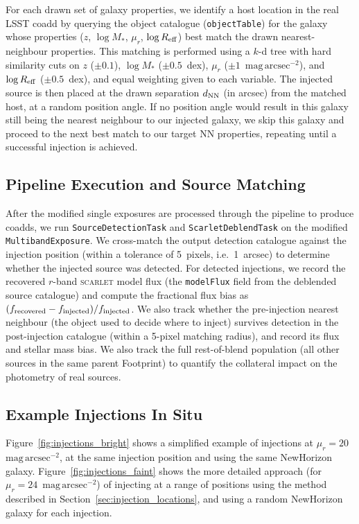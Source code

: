 \documentclass[DM,lsstdraft,authoryear,toc]{lsstdoc}
\newcommand{\mur}{\ensuremath{\mu_r}\xspace}
\newcommand{\Reff}{\ensuremath{R_{\rm eff}}\xspace}
\newcommand{\scarlet}{\textsc{scarlet}\xspace}
\newcommand{\task}[1]{\texttt{#1}\xspace}
\begin{document}
For each drawn set of galaxy properties, we identify a host location in the
real LSST coadd by querying the object catalogue (\texttt{objectTable}) for
the galaxy whose properties ($z$, $\log M_*$, $\mur$, $\log \Reff$) best
match the drawn nearest-neighbour properties. This matching is performed using
a $k$-d tree with hard similarity cuts on $z$ ($\pm 0.1$), $\log M_*$
($\pm 0.5$~dex), $\mur$ ($\pm 1$~$\mathrm{mag\,arcsec^{-2}}$), and
$\log \Reff$ ($\pm 0.5$~dex), and equal weighting given to each variable. The
injected source is then placed at the drawn separation $d_{\rm NN}$ (in arcsec)
from the matched host, at a random position angle. If no position angle would
result in this galaxy still being the nearest neighbour to our injected galaxy,
we skip this galaxy and proceed to the next best match to our target NN
properties, repeating until a successful injection is achieved.

\subsection{Pipeline Execution and Source Matching}
\label{sec:source_matching}

After the modified single exposures are processed through the pipeline to
produce coadds, we run \task{SourceDetectionTask} and
\task{ScarletDeblendTask} on the modified \texttt{MultibandExposure}. We
cross-match the output detection catalogue against the injection position
(within a tolerance of 5~pixels, i.e.\ 1~arcsec) to determine whether the
injected source was detected. For detected injections, we record the recovered
$r$-band \scarlet model flux (the \texttt{modelFlux} field from the deblended
source catalogue) and compute the fractional flux bias as
$(f_{\rm recovered} - f_{\rm injected}) / f_{\rm injected}$. We also track
whether the pre-injection nearest neighbour (the object used to decide where
to inject) survives detection in the post-injection catalogue (within a
5-pixel matching radius), and record its flux and stellar mass bias. We also
track the full rest-of-blend population (all other sources in the same parent
Footprint) to quantify the collateral impact on the photometry of real sources.

\subsection{Example Injections In Situ}
\label{sec:example_injections}

Figure~\ref{fig:injections_bright} shows a simplified example of injections
at $\mur = 20$~$\mathrm{mag\,arcsec^{-2}}$, at the same injection position
and using the same NewHorizon galaxy.
Figure~\ref{fig:injections_faint} shows the more detailed approach (for
$\mur = 24$~$\mathrm{mag\,arcsec^{-2}}$) of injecting at a range of
positions using the method described in Section~\ref{sec:injection_locations},
and using a random NewHorizon galaxy for each injection.
\end{document}

